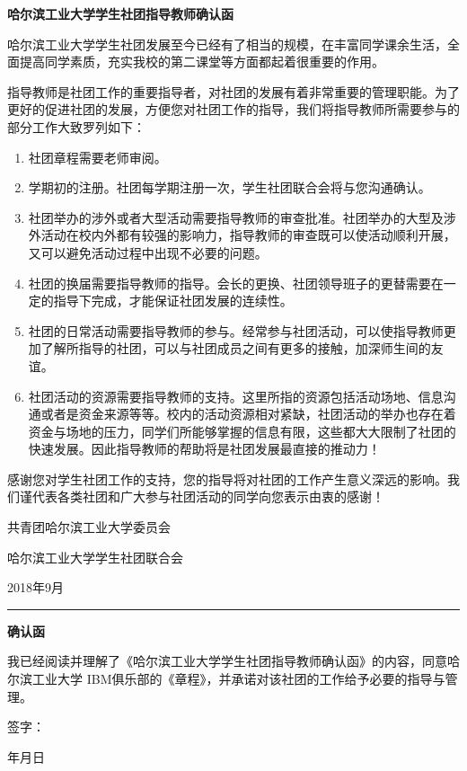 \documentclass{BaseSetting}
\def\publishdate{2018年9月}
\def\clubname{IBM俱乐部}
\begin{document}
\begin{center}
    \Large \textbf{哈尔滨工业大学学生社团指导教师确认函}
\end{center}

哈尔滨工业大学学生社团发展至今已经有了相当的规模，在丰富同学课余生活，全面提高同学素质，充实我校的第二课堂等方面都起着很重要的作用。

指导教师是社团工作的重要指导者，对社团的发展有着非常重要的管理职能。为了更好的促进社团的发展，方便您对社团工作的指导，我们将指导教师所需要参与的部分工作大致罗列如下：

\begin{enumerate}
\item 社团章程需要老师审阅。
\item 学期初的注册。社团每学期注册一次，学生社团联合会将与您沟通确认。
\item 社团举办的涉外或者大型活动需要指导教师的审查批准。社团举办的大型及涉外活动在校内外都有较强的影响力，指导教师的审查既可以使活动顺利开展，又可以避免活动过程中出现不必要的问题。
\item 社团的换届需要指导教师的指导。会长的更换、社团领导班子的更替需要在一定的指导下完成，才能保证社团发展的连续性。
\item 社团的日常活动需要指导教师的参与。经常参与社团活动，可以使指导教师更加了解所指导的社团，可以与社团成员之间有更多的接触，加深师生间的友谊。
\item 社团活动的资源需要指导教师的支持。这里所指的资源包括活动场地、信息沟通或者是资金来源等等。校内的活动资源相对紧缺，社团活动的举办也存在着资金与场地的压力，同学们所能够掌握的信息有限，这些都大大限制了社团的快速发展。因此指导教师的帮助将是社团发展最直接的推动力！
\end{enumerate}

感谢您对学生社团工作的支持，您的指导将对社团的工作产生意义深远的影响。我们谨代表各类社团和广大参与社团活动的同学向您表示由衷的感谢！

\begin{flushright}
共青团哈尔滨工业大学委员会

哈尔滨工业大学学生社团联合会

\publishdate

\end{flushright}

\begin{center}
\rule{\linewidth}{0.2mm}

\textbf{确认函}
\end{center}

我已经阅读并理解了《哈尔滨工业大学学生社团指导教师确认函》的内容，同意哈尔滨工业大学 \clubname 的《章程》，并承诺对该社团的工作给予必要的指导与管理。 


\begin{flushright}
签字：\hspace{0.2\linewidth}

年\hspace{0.05\linewidth}月\hspace{0.05\linewidth}日
\end{flushright}
\end{document}
